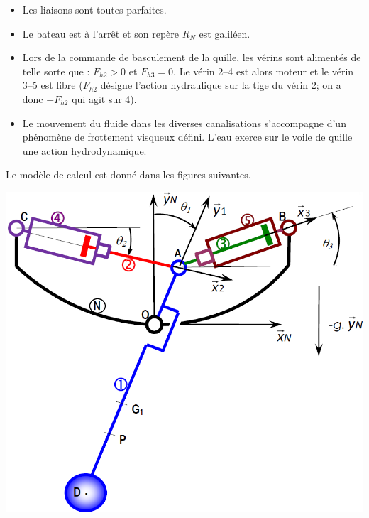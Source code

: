 \begin{multicols}{2}
\begin{itemize}
\item Les liaisons sont toutes parfaites.
\item Le bateau est à l’arrêt et son repère $R_N$ est galiléen.
\item Lors de la commande de basculement de la quille, les vérins sont alimentés de telle sorte que : $F_{h2} > 0$ et
$F_{h3} = 0$. Le vérin 2--4 est alors moteur et le vérin 3--5 est libre ($F_{h2}$ désigne l'action hydraulique sur la tige du vérin 2; on a donc $-F_{h2}$ qui agit sur 4).
\item Le mouvement du fluide dans les diverses canalisations s’accompagne d’un phénomène de frottement visqueux défini. L’eau exerce sur le voile de quille une action hydrodynamique.
\end{itemize}

Le modèle de calcul est donné dans les figures suivantes.

\begin{center}
\includegraphics[width=.7\linewidth]{images/fig_05_a}


\end{center}
\end{multicols}
